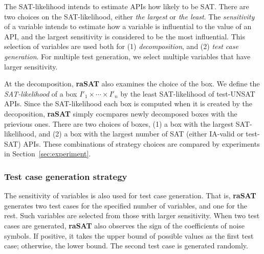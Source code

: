 \documentclass[runningheads,a4paper,oribibl]{llncs}
\begin{document}
The SAT-likelihood intends to estimate APIs how likely to be SAT. 
There are two choices on the SAT-likelihood, either {\em the largest} or {\em the least}. 
The {\em sensitivity} of a variable intends to estimate how a variable is influential
to the value of an API, and the largest sensitivity is considered to be the most influential. 
This selection of variables are used both for (1) {\em decomposition}, and 
(2) {\em test case generation}. 
For multiple test generation, we select multiple variables that have larger sensitivity. 

At the decomposition, {\bf raSAT} also examines the choice of the box.
We define the {\em SAT-likelihood} of a box $I'_1 \times \cdots \times I'_n$ by 
the least SAT-likelihood of test-UNSAT APIs. 
Since the SAT-likelihood each box is computed when it is created by the decoposition,
{\bf raSAT} simply cocmpares newly decomposed boxes with the prievious ones. 
There are two choices of boxes, 
(1) a box with the largest SAT-likelihood, and 
(2) a box with the largest number of SAT (either IA-valid or test-SAT) APIs. 
These combinations of strategy choices are compared by experiments in Section~\ref{sec:experiment}. 


\subsubsection*{Test case generation strategy}
\sloppy
The sensitivity of variables is also used for test case generation.
That is, {\bf raSAT} generates two test cases for the specified number of variables,
and one for the rest. 
Such variables are selected from those with larger sensitivity.
When two test cases are generated, {\bf raSAT} also observes
the sign of the coefficients of noise symbols.
If positive, it takes the upper bound of possible values as the first test case; 
otherwise, the lower bound. The second test case is generated randomly. 
\end{document}
